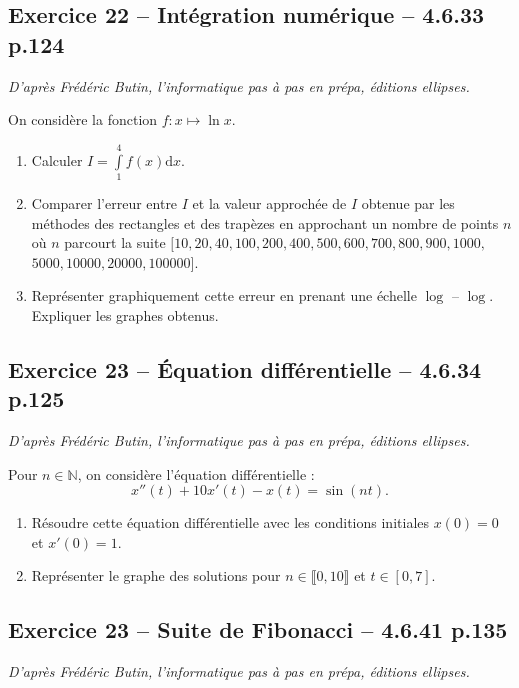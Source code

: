 \documentclass[10pt,fleqn]{article} %
\begin{document}
\begin{multicols}{2}
\subsection*{Exercice 22 -- Intégration numérique -- 4.6.33 p.124}
\begin{flushright}
\textit{D'après Frédéric Butin, l'informatique pas à pas en prépa, éditions ellipses.}
\end{flushright}

On considère la fonction $f:x \mapsto \ln x$.
\begin{enumerate}
\item Calculer $I=\int\limits_1^4 f(x) \text{d}x$.
\item Comparer l'erreur entre $I$ et la valeur approchée de $I$ obtenue par les méthodes des rectangles et des trapèzes en approchant un nombre de points $n$ où $n$ parcourt la suite $[10,20,40,100,200, 400, 500, 600, 700, 800, 900, 1000,$ $5000, 10000, 20000, 100000]$.
\item Représenter graphiquement cette erreur en prenant une échelle $\log$ -- $\log$. Expliquer les graphes obtenus.
\end{enumerate}


\subsection*{Exercice 23 -- Équation différentielle -- 4.6.34 p.125}
\begin{flushright}
\textit{D'après Frédéric Butin, l'informatique pas à pas en prépa, éditions ellipses.}
\end{flushright}

Pour $n \in \mathbb{N}$, on considère l'équation différentielle : 
$$
x''(t) +10 x'(t) - x(t)=\sin \left( nt \right).
$$
\begin{enumerate}
\item Résoudre cette équation différentielle avec les conditions initiales $x(0)=0$ et $x'(0)=1$.
\item Représenter le graphe des solutions pour $n\in \llbracket 0,10 \rrbracket$ et $t \in[0,7]$.
\end{enumerate}

\subsection*{Exercice 23 -- Suite de Fibonacci -- 4.6.41 p.135}
\begin{flushright}
\textit{D'après Frédéric Butin, l'informatique pas à pas en prépa, éditions ellipses.}
\end{flushright}


\end{multicols}
\end{document}
